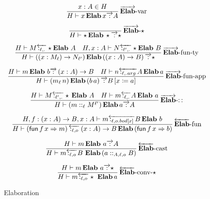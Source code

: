 \begin{figure}
\[
\frac{
  x:A\in H
}{
  H\vdash x\,\textbf{Elab}\,x\overrightarrow{\,:\,}A
}
\operatorname{\overrightarrow{\textbf{Elab}}-var}
\]
 
\[
\frac{\,}{H\vdash\star\,\textbf{Elab}\,\star\overrightarrow{\,:\,}\star}
\operatorname{\overrightarrow{\textbf{Elab}}-\star}
\]
 
\[
\frac{
  H\vdash M\overleftarrow{\,:_{\ell,.}\,}\star\textbf{Elab}\ A\quad H,x:A\vdash N\overleftarrow{\,:_{\ell',.}\,}\star\textbf{Elab}\ B
}{
  H\vdash\left(\left(x:M_{\ell}\right)\rightarrow N_{\ell'}\right)\textbf{Elab}\left(\left(x:A\right)\rightarrow B\right)\overrightarrow{\,:\,}\star
}
\operatorname{\overrightarrow{\textbf{Elab}}-fun-ty}
\]
 
\[
\frac{H\vdash m\,\textbf{Elab}\ b\overrightarrow{\,:\,}\left(x:A\right)\rightarrow B\quad H\vdash n\overleftarrow{\,:_{\ell,.arg}\,}A\,\textbf{Elab}\,a}{H\vdash\left(m_{\ell}\,n\right)\textbf{Elab}\left(b\,a\right)\overrightarrow{\,:\,}B\left[x\coloneqq a\right]}\rulename{\overrightarrow{\textbf{Elab}}-fun-app}
\]
 
\[
\frac{H\vdash M\overleftarrow{\,:_{\ell',.}\,}\star\,\textbf{Elab}\ A\quad H\vdash m\overleftarrow{\,:_{\ell,.}\,}A\,\textbf{Elab}\ a}{H\vdash\left(m::_{\ell}M^{\ell'}\right)\textbf{Elab}\,a\overrightarrow{\,:\,}A}\rulename{\overrightarrow{\textbf{Elab}}-::}
\]
 
\[
\frac{H,f:\left(x:A\right)\rightarrow B,x:A\vdash m\overleftarrow{\,:_{\ell,o.bod[x]}\,}B\,\textbf{Elab}\ b}{H\vdash\left(\mathsf{fun}\,f\,x\Rightarrow m\right)\overleftarrow{\,:_{\ell,o}\,}\left(x:A\right)\rightarrow B\,\textbf{Elab}\left(\mathsf{fun}\,f\,x\Rightarrow b\right)}\rulename{\overleftarrow{\textbf{Elab}}-fun}
\]
 
\[
\frac{H\vdash m\,\textbf{Elab}\ a\overrightarrow{\,:\,}A}{H\vdash m\overleftarrow{\,:_{\ell,o}\,}B\ \textbf{Elab}\left(a::_{A,\ell,o}B\right)}\rulename{\overleftarrow{\textbf{Elab}}-cast}
\]
 
\[
\frac{H\vdash m\,\textbf{Elab}\ a\overrightarrow{\,:\,}\star}{H\vdash m\overleftarrow{\,:_{\ell,o}\,}\star\ \textbf{Elab}\,a}\rulename{\overleftarrow{\textbf{Elab}}-conv-\star}
\]
 
 
\caption{Elaboration}
\label{fig:elaboration}
\end{figure}
 
